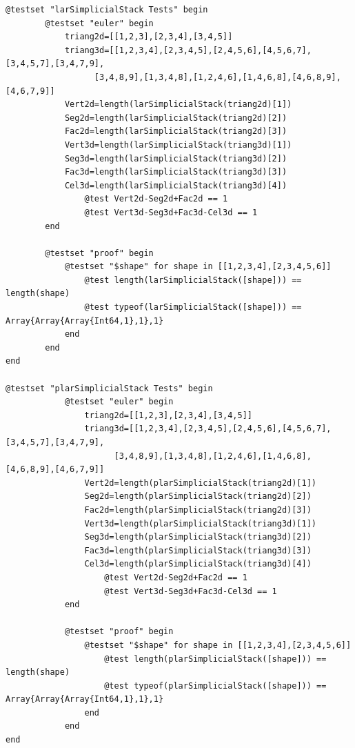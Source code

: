\documentclass{article}
\begin{document}
\begin{flushleft}\small
\begin{list}{}{} \item
\begin{Verbatim}[tabsize=4]
@testset "larSimplicialStack Tests" begin
        @testset "euler" begin
			triang2d=[[1,2,3],[2,3,4],[3,4,5]]
            triang3d=[[1,2,3,4],[2,3,4,5],[2,4,5,6],[4,5,6,7],[3,4,5,7],[3,4,7,9],
                  [3,4,8,9],[1,3,4,8],[1,2,4,6],[1,4,6,8],[4,6,8,9],[4,6,7,9]]
            Vert2d=length(larSimplicialStack(triang2d)[1])
            Seg2d=length(larSimplicialStack(triang2d)[2])
            Fac2d=length(larSimplicialStack(triang2d)[3])
            Vert3d=length(larSimplicialStack(triang3d)[1])
            Seg3d=length(larSimplicialStack(triang3d)[2])
            Fac3d=length(larSimplicialStack(triang3d)[3])
            Cel3d=length(larSimplicialStack(triang3d)[4])
                @test Vert2d-Seg2d+Fac2d == 1
                @test Vert3d-Seg3d+Fac3d-Cel3d == 1
		end
		
		@testset "proof" begin
			@testset "$shape" for shape in [[1,2,3,4],[2,3,4,5,6]]
				@test length(larSimplicialStack([shape])) == length(shape)
				@test typeof(larSimplicialStack([shape])) == Array{Array{Array{Int64,1},1},1}
			end
		end
end	
	
@testset "plarSimplicialStack Tests" begin
            @testset "euler" begin
    			triang2d=[[1,2,3],[2,3,4],[3,4,5]]
                triang3d=[[1,2,3,4],[2,3,4,5],[2,4,5,6],[4,5,6,7],[3,4,5,7],[3,4,7,9],
                      [3,4,8,9],[1,3,4,8],[1,2,4,6],[1,4,6,8],[4,6,8,9],[4,6,7,9]]
                Vert2d=length(plarSimplicialStack(triang2d)[1])
                Seg2d=length(plarSimplicialStack(triang2d)[2])
                Fac2d=length(plarSimplicialStack(triang2d)[3])
                Vert3d=length(plarSimplicialStack(triang3d)[1])
                Seg3d=length(plarSimplicialStack(triang3d)[2])
                Fac3d=length(plarSimplicialStack(triang3d)[3])
                Cel3d=length(plarSimplicialStack(triang3d)[4])
                    @test Vert2d-Seg2d+Fac2d == 1
                    @test Vert3d-Seg3d+Fac3d-Cel3d == 1
    		end
		
	    	@testset "proof" begin
		    	@testset "$shape" for shape in [[1,2,3,4],[2,3,4,5,6]]
			    	@test length(plarSimplicialStack([shape])) == length(shape)
				    @test typeof(plarSimplicialStack([shape])) ==  Array{Array{Array{Int64,1},1},1}
			    end
		    end
end	

\end{Verbatim}
\end{list}
\end{flushleft}
\end{document}

